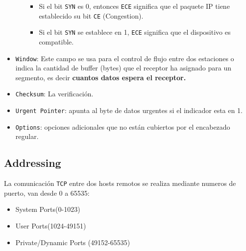 \begin{itemize}
\begin{itemize}
\begin{itemize}
\item Si el bit \texttt{SYN} es 0, entonces \texttt{ECE} significa que el paquete IP tiene establecido su bit \texttt{CE} (Congestion).
\item  Si el bit \texttt{SYN} se establece en 1, \texttt{ECE} significa que el dispositivo es compatible.
\end{itemize}
\end{itemize}
\item \texttt{Window}: Este campo se usa para el control de flujo entre dos estaciones o indica la cantidad de buffer (bytes) que el receptor ha asignado para un segmento, es decir \textbf{cuantos datos espera el receptor.}
\item \texttt{Checksum}: La verificación.
\item \texttt{Urgent Pointer}: apunta al byte de datos urgentes si el indicador esta en 1.
\item \texttt{Options}: opciones adicionales que no están cubiertos por el encabezado regular.
\end{itemize}
\subsection*{Addressing}
La comunicación \texttt{TCP} entre dos hosts remotos se realiza mediante numeros de puerto, van desde 0 a 65535:
\begin{itemize}
\item System Ports(0-1023)
\item User Ports(1024-49151)
\item Private/Dynamic Ports (49152-65535)
\end{itemize}
